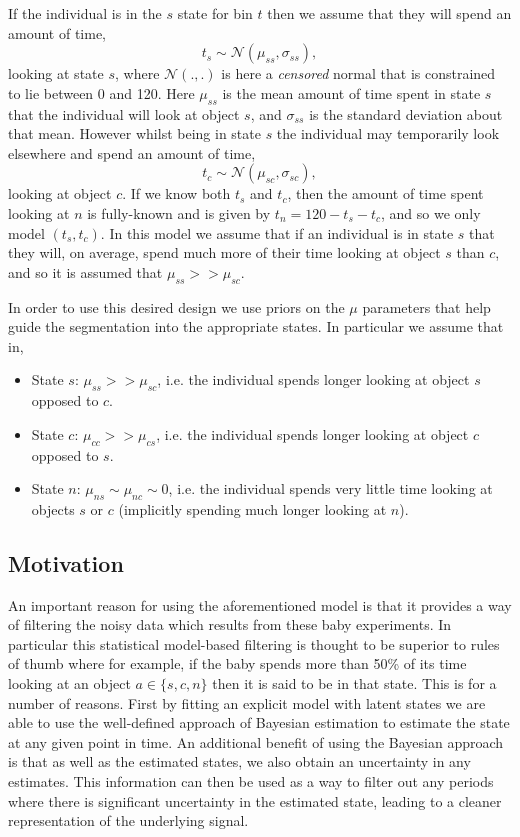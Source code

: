 \documentclass[9pt]{article}
\begin{document}
If the individual is in the $s$ state for bin $t$ then we assume that they will spend an amount of time,
%
\begin{equation}
t_{s} \sim \mathcal{N}(\mu_{ss},\sigma_{ss}),
\end{equation}
%
looking at state $s$, where $\mathcal{N}(.,.)$ is here a \textit{censored} normal that is constrained to lie between 0 and 120. Here $\mu_{ss}$ is the mean amount of time spent in state $s$ that the individual will look at object $s$, and $\sigma_{ss}$ is the standard deviation about that mean. However whilst being in state $s$ the individual may temporarily look elsewhere and spend an amount of time,
%
\begin{equation}
t_c \sim \mathcal{N}(\mu_{sc},\sigma_{sc}),
\end{equation} 
%
looking at object $c$. If we know both $t_s$ and $t_c$, then the amount of time spent looking at $n$ is  fully-known and is given by $t_n = 120 - t_s - t_c$, and so we only model $(t_s,t_c)$. In this model we assume that if an individual is in state $s$ that they will, on average, spend much more of their time looking at object $s$ than $c$, and so it is assumed that $\mu_{ss}>>\mu_{sc}$. 

In order to use this desired design we use priors on the $\mu$ parameters that help guide the segmentation into the appropriate states. In particular we assume that in,
%
\begin{itemize}
\item State $s$: $\mu_{ss}>>\mu_{sc}$, i.e. the individual spends longer looking at object $s$ opposed to $c$. 
\item State $c$: $\mu_{cc}>>\mu_{cs}$, i.e. the individual spends longer looking at object $c$ opposed to $s$. 
\item State $n$: $\mu_{ns}\sim \mu_{nc} \sim 0$, i.e. the individual spends very little time looking at objects $s$ or $c$ (implicitly spending much longer looking at $n$).
\end{itemize}
%
\subsection{Motivation}
An important reason for using the aforementioned model is that it provides a way of filtering the noisy data which results from these baby experiments. In particular this statistical model-based filtering is thought to be superior to rules of thumb where for example, if the baby spends more than 50\% of its time looking at an object $a\in\{s,c,n\}$ then it is said to be in that state. This is for a number of reasons. First by fitting an explicit model with latent states we are able to use the well-defined approach of Bayesian estimation to estimate the state at any given point in time. An additional benefit of using the Bayesian approach is that as well as the estimated states, we also obtain an uncertainty in any estimates. This information can then be used as a way to filter out any periods where there is significant uncertainty in the estimated state, leading to a cleaner representation of the underlying signal.
\end{document}
